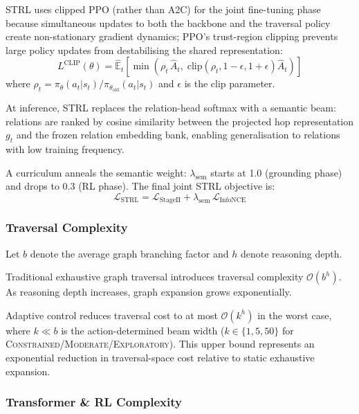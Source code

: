 \documentclass[10pt,conference]{IEEEtran}
\begin{document}
STRL uses clipped PPO (rather than A2C) for the joint fine-tuning phase because simultaneous updates to both the backbone and the traversal policy create non-stationary gradient dynamics; PPO's trust-region clipping prevents large policy updates from destabilising the shared representation:
\begin{equation}
L^{\text{CLIP}}(\theta) = \hat{\mathbb{E}}_t\!\left[\min\!\left(\rho_t\,\hat{A}_t,\; \text{clip}(\rho_t, 1{-}\epsilon, 1{+}\epsilon)\hat{A}_t\right)\right]
\end{equation}
where $\rho_t = \pi_\theta(a_t|s_t) / \pi_{\theta_{\text{old}}}(a_t|s_t)$ and $\epsilon$ is the clip parameter.

At inference, STRL replaces the relation-head softmax with a semantic beam: relations are ranked by cosine similarity between the projected hop representation $g_t$ and the frozen relation embedding bank, enabling generalisation to relations with low training frequency.

A curriculum anneals the semantic weight: $\lambda_{\text{sem}}$ starts at 1.0 (grounding phase) and drops to 0.3 (RL phase). The final joint STRL objective is:
\begin{equation}
\mathcal{L}_{\text{STRL}} = \mathcal{L}_{\text{StageII}} + \lambda_{\text{sem}}\,\mathcal{L}_{\text{InfoNCE}}
\end{equation}

\subsubsection{Traversal Complexity}

Let $b$ denote the average graph branching factor and $h$ denote reasoning depth.

Traditional exhaustive graph traversal introduces traversal complexity $\mathcal{O}(b^h)$. As reasoning depth increases, graph expansion grows exponentially.

Adaptive control reduces traversal cost to at most $\mathcal{O}(k^h)$ in the worst case, where $k \ll b$ is the action-determined beam width ($k \in \{1, 5, 50\}$ for \textsc{Constrained}/\textsc{Moderate}/\textsc{Exploratory}). This upper bound represents an exponential reduction in traversal-space cost relative to static exhaustive expansion.

\subsubsection{Transformer \& RL Complexity}
\end{document}
